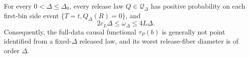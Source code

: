 For every \(0<\Delta\leq\Delta_0\), every release law \(Q\in\mathcal Q_\Delta\) has positive probability on each first-bin side event \(\{T=t,Q_\Delta(R)=0\}\), and
\[
 2c_L\Delta\leq\omega_\Delta\leq4L\Delta.
\]
Consequently, the full-data causal functional \(\tau_P(b)\) is generally not point identified from a fixed-\(\Delta\) released law, and its worst release-fiber diameter is of order \(\Delta\).